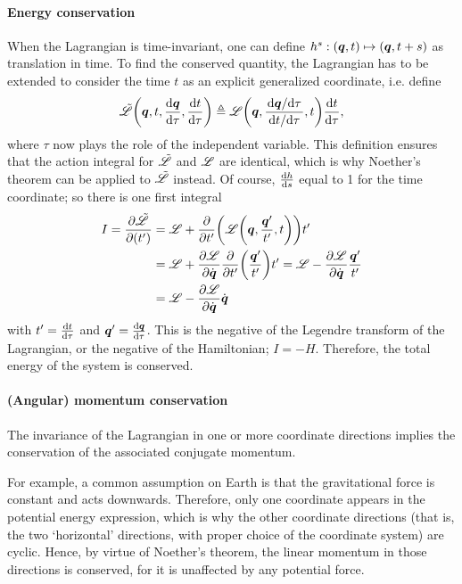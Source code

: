 \paragraph{Energy conservation} When the Lagrangian is time-invariant, one can define $h^s: (\vb*{q}, t) \mapsto (\vb*{q}, t + s)$ as translation in time. To find the conserved quantity, the Lagrangian has to be extended to consider the time $t$ as an explicit generalized coordinate, i.e. define
$$ \tilde{\mathscr{L}}\qty(\vb*{q}, t, \dv{\ensuremath{\vb*{q}}}{\tau}, \dv{t}{\tau}) \triangleq \mathscr{L}\qty(\vb*{q}, \frac{\dv*{\vb*{q}}{\tau}}{\dv*{t}{\tau}}, t)\dv{t}{\tau},$$
where $\tau$ now plays the role of the independent variable. This definition ensures that the action integral for $\tilde{\mathscr{L}}$ and $\mathscr{L}$ are identical, which is why Noether's theorem can be applied to $\tilde{\mathscr{L}}$ instead. Of course, $\dv{h}{s}$ equal to 1 for the time coordinate; so there is one first integral
\begin{equation*}
    \begin{split}
        I = \pdv{\tilde{\ensuremath{\mathscr{L}}}}{(t')} 
        &= \mathscr{L} + \pdv{}{t'}\qty(\mathscr{L}\qty(\vb*{q}, \frac{
        \vb*{q}'}{t'}, t))t'\\
        &= \mathscr{L} + \pdv{\ensuremath{\mathscr{L}}}{\ensuremath{\dot{\vb*{q}}}}\pdv{}{t'}\qty(\frac{
        \vb*{q}'}{t'})t' = \mathscr{L} - \pdv{\ensuremath{\mathscr{L}}}{\ensuremath{\dot{\vb*{q}}}}\frac{\vb*{q}'}{t'}\\
        &= \mathscr{L} - \pdv{\ensuremath{\mathscr{L}}}{\ensuremath{\dot{\vb*{q}}}}\dot{\vb*{q}}
    \end{split}
\end{equation*}
with $t' = \dv{t}{\tau}$ and $\vb*{q}' = \dv{\ensuremath{\vb*{q}}}{\tau}$. This is the negative of the Legendre transform of the Lagrangian, or the negative of the Hamiltonian; $I = -H$. Therefore, the total energy of the system is conserved. 

\paragraph{(Angular) momentum conservation} The invariance of the Lagrangian in one or more coordinate directions implies the conservation of the associated conjugate momentum. 

For example, a common assumption on Earth is that the gravitational force is constant and acts downwards. Therefore, only one coordinate appears in the potential energy expression, which is why the other coordinate directions (that is, the two `horizontal' directions, with proper choice of the coordinate system) are cyclic. Hence, by virtue of Noether's theorem, the linear momentum in those directions is conserved, for it is unaffected by any potential force.

